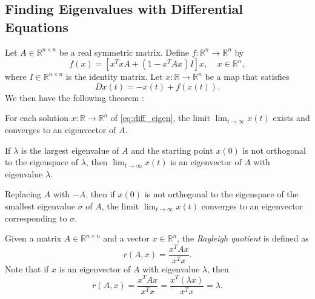 \subsection{Finding Eigenvalues with Differential Equations}\label{sec:project theory}

Let $A\in\mathbb{R}^{n\times n}$ be a real symmetric matrix. Define $f\colon\mathbb{R}^n\to\mathbb{R}^n$ by
\begin{equation}\label{eq:diff_eigen_f}
f(x)=[x^TxA+(1-x^TAx)I]x,\;\;\;\; x\in\mathbb{R}^n,
\end{equation}
where $I\in\mathbb{R}^{n\times n}$ is the identity matrix. Let $x\colon\mathbb{R}\to\mathbb{R}^n$ be a map that satisfies
\begin{equation}\label{eq:diff_eigen}
    Dx(t)=-x(t)+f(x(t)).
\end{equation}
We then have the following theorem \cite{yfh04}:
\begin{theorem}\label{thrm:eigenvector_convergence}
For each solution $x\colon\mathbb{R}\to\mathbb{R}^n$ of \autoref{eq:diff_eigen}, the limit $\lim_{t\to\infty}x(t)$ exists and converges to an eigenvector of $A$.

If $\lambda$ is the largest eigenvalue of $A$ and the starting point $x(0)$ is not orthogonal to the eigenspace of $\lambda$, then $\lim_{t\to\infty}x(t)$ is an eigenvector of $A$ with eigenvalue $\lambda$.

Replacing $A$ with $-A$, then if $x(0)$ is not orthogonal to the eigenspace of the smallest eigenvalue $\sigma$ of $A$, the limit $\lim_{t\to\infty}x(t)$ converges to an eigenvector corresponding to $\sigma$.
\end{theorem}

\begin{definition}\label{def:rayleigh_quotient}
Given a matrix $A\in\mathbb{R}^{n\times n}$ and a vector $x\in\mathbb{R}^n$, the \emph{Rayleigh quotient} is defined as
\begin{equation*}
    r(A,x) = \frac{x^TAx}{x^Tx}.
\end{equation*}
Note that if $x$ is an eigenvector of $A$ with eigenvalue $\lambda$, then
\begin{equation*}
    r(A,x)=\frac{x^TAx}{x^Tx}=\frac{x^T (\lambda x)}{x^T x}=\lambda.
\end{equation*}
\end{definition}